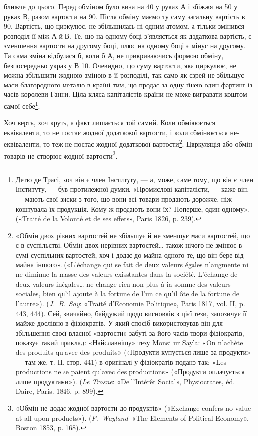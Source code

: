 \parcont{}  %
ближче до цього. Перед обміном було вина на 40
у руках $А$ і збіжжя на 50 у руках $В$, разом
вартости на 90. Після обміну маємо ту саму
загальну вартість в 90. Вартість, що циркулює,
не збільшилась ні одним атомом, а тільки змінився розподіл її
між $А$ й $В$. Те, що на одному боці з’являється як додаткова вартість,
є зменшення вартости на другому боці, плюс на одному
боці є мінус на другому. Та сама зміна відбулася б, коли б $А$, не
прикриваючись формою обміну, безпосередньо украв у $В$ 10. Очевидно, що суму вартости, яка циркулює, не
можна збільшити жодною зміною в її розподілі, так само як єврей
не збільшує маси благородного металю в країні тим, що продає
за одну ґінею один фартинґ із часів королеви Ганни. Ціла
кляса капіталістів країни не може вигравати коштом самої себе\footnote{
Детю де Трасі, хоч він є член Інституту, — а, може, саме тому,
що він є член Інституту, — був протилежної думки. «Промислові капіталісти,
— каже він, — мають свої зиски з того, що вони всі товари продають
дорожче, ніж коштувала їх продукція. Кому ж продають вони їх?
Поперше, один одному». («Traité de la Volonté et de ses effets», Paris
1826, p. 239).
}.

Хоч верть, хоч круть, а факт лишається той самий. Коли обмінюється
еквіваленти, то не постає жодної додаткової вартости,
і коли обмінюється не-еквіваленти, то теж не постає жодної додаткової
вартости\footnote{
«Обмін двох рівних вартостей не збільшує й не зменшує маси вартостей,
що є в суспільстві. Обмін двох нерівних вартостей\dots{} також нічого
не змінює в сумі суспільних вартостей, хоч і додає до майна одного те,
що він бере від майна іншого». («L’échange qui se fait de deux valeurs
égales n’augmente ni ne diminue la masse des valeurs exisstantes dans la
société. L’échange de deux valeurs inégales\dots{} ne change rien non plus à ia
somme des valeurs sociales, bien qu’il ajoute à la fortune de l’un ce qu’il
ôte de la fortune de l’autre»). (\emph{J.~B.~Say}: «Traité d’Economie Politique»,
Paris 1817, vol. II, p. 443, 444). Сей, звичайно, байдужий щодо висновків
з цієї тези, запозичує її майже дослівно в фізіократів. У який спосіб використовував
він для збільшення своєї власної «вартости» забуті за його
часів твори фізіократів, показує такий приклад: «Найславнішу» тезу
Monsi ur Say’a: «On n’achète des produits qu’avec des produits» («Продукти
купується лише за продукти» — там же, т. II, стор. 441) в ориґіналі
у фізіократів подано так: «Les productions ne se paient qu’avec des
productions» («Продукти оплачується лише продуктами»). (\emph{Le Trosne}:
«De l’Intérêt Social», Physiocrates, éd. Daire, Paris. 1846, p. 899).
}. Циркуляція або обмін товарів не створює
жодної вартости\footnote{
«Обмін не додає жодної вартости до продуктів» («Exchange confers
no value at all upon products»). (\emph{F.~Wayland}: «The Elements of Political
Economy», Boston 1853, p. 168).
}.

